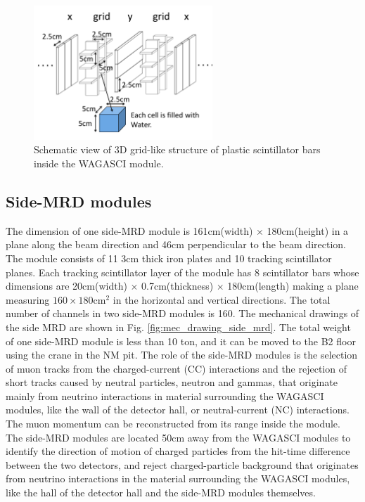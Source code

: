 \begin{figure}%
  \begin{center}
  \includegraphics[width=0.6\textwidth]{figs/3d_grid_structure.pdf}
  \caption{Schematic view of 3D grid-like structure of plastic scintillator bars inside the WAGASCI module.}
  \label{fig:3d_grid_structure}
  \end{center}
\end{figure}


\subsection{Side-MRD modules}
The dimension of one side-MRD module is 161cm(width) $\times$ 180cm(height) 
in a plane along the beam direction and 46cm perpendicular to the beam direction.
The module consists of 11 3cm thick iron plates and 10 tracking scintillator planes.
Each tracking scintillator layer of the module has 8 scintillator bars whose dimensions are
20cm(width) $\times$ 0.7cm(thickness) $\times$ 180cm(length) making a plane measuring $160\times180$cm$^{2}$
in the horizontal and vertical directions.
The total number of channels in two side-MRD modules is 160.
The mechanical drawings of the side MRD are shown in Fig. \ref{fig:mec_drawing_side_mrd}.
The total weight of one side-MRD module is less than 10 ton, and it can be moved to the B2 floor using the crane in the NM pit.
The role of the side-MRD modules is the selection of muon tracks from the charged-current (CC) interactions and the rejection of short tracks caused by neutral particles, neutron and gammas,
that originate mainly from neutrino interactions in material surrounding the WAGASCI modules,
like the wall of the detector hall, or neutral-current (NC) interactions.
The muon momentum can be reconstructed from its range inside the module.
The side-MRD modules are located 50cm away from the WAGASCI modules to identify the 
direction of motion of charged particles from the hit-time difference between the two detectors,
and reject charged-particle background that originates from neutrino interactions
in the material surrounding the WAGASCI modules, like the hall of the detector hall and the side-MRD modules themselves.

